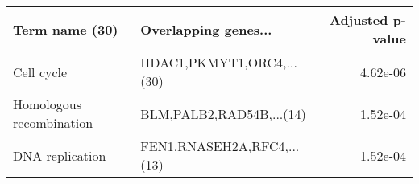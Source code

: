 \begin{tabular}{llr}
\toprule
          Term name (30) &       Overlapping genes... &  Adjusted p-value \\
\midrule
              Cell cycle &  HDAC1,PKMYT1,ORC4,...(30) &          4.62e-06 \\
Homologous recombination &   BLM,PALB2,RAD54B,...(14) &          1.52e-04 \\
         DNA replication & FEN1,RNASEH2A,RFC4,...(13) &          1.52e-04 \\
\bottomrule
\end{tabular}
